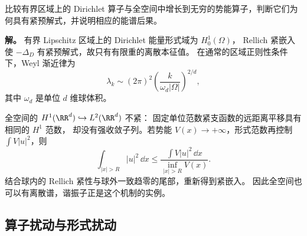 \begin{example}[受限区域与增长势]
比较有界区域上的 Dirichlet 算子与全空间中增长到无穷的势能算子，判断它们为何具有紧预解式，并说明相应的能谱后果。

\textbf{解。} 有界 Lipschitz 区域上的 Dirichlet 能量形式域为 $H_0^1(\Omega)$，
Rellich 紧嵌入使 $-\Delta_D$ 有紧预解式，故只有有限重的离散本征值。
在通常的区域正则性条件下，Weyl 渐近律为
\[
\lambda_k\sim(2\pi)^2
\left(\frac{k}{\omega_d|\Omega|}\right)^{2/d},
\]
其中 $\omega_d$ 是单位 $d$ 维球体积。

全空间的 $H^1(\RR^d)\hookrightarrow L^2(\RR^d)$ 不紧：
固定单位范数紧支函数的远距离平移具有相同的 $H^1$ 范数，
却没有强收敛子列。若势能 $V(x)\to+\infty$，形式范数再控制
$\int V|u|^2$，则
\[
\int_{|x|>R}|u|^2\,\dd x
\le\frac{\int V|u|^2\,\dd x}{\inf_{|x|>R}V(x)}.
\]
结合球内的 Rellich 紧性与球外一致趋零的尾部，重新得到紧嵌入。
因此全空间也可以有离散谱，谐振子正是这个机制的实例。
\end{example}

\subsection{算子扰动与形式扰动}

